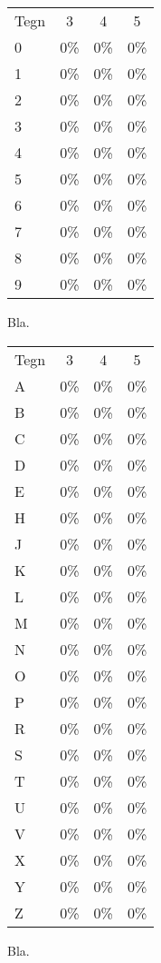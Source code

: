 \begin{figure}[htp]
\centering
\begin{tabular}{|l|c|c|c|}\hline
\rowcolor[gray]{0.9} \multicolumn{4}{|>{\columncolor[gray]{0.9}}c|}{\textbf{Sum-billeder}} \\ \hline
Tegn & 3 & 4 & 5\\\hline
0 & 0\% & 0\% & 0\%\\\hline
1 & 0\%  & 0\% & 0\%\\\hline
2 & 0\% & 0\% & 0\%\\\hline
3 & 0\% & 0\% & 0\%\\\hline
4 & 0\% & 0\% & 0\%\\\hline
5 & 0\% & 0\% & 0\%\\\hline
6 & 0\% & 0\% & 0\%\\\hline
7 & 0\% & 0\% & 0\%\\\hline
8 & 0\% & 0\% & 0\%\\\hline
9 & 0\% & 0\% & 0\%\\\hline
\end{tabular}
\caption{Bla.}
\label{fig:test:sum_tal}
\end{figure}

\begin{figure}[htp]
\centering
\begin{tabular}{|l|c|c|c|}\hline
\rowcolor[gray]{0.9} \multicolumn{4}{|>{\columncolor[gray]{0.9}}c|}{\textbf{Sum-billeder}} \\ \hline
Tegn & 3 & 4 & 5\\\hline
A & 0\% & 0\% & 0\%\\\hline
B & 0\% & 0\% & 0\%\\\hline
C & 0\% & 0\% & 0\%\\\hline
D & 0\% & 0\% & 0\%\\\hline
E & 0\% & 0\% & 0\%\\\hline
H & 0\% & 0\% & 0\%\\\hline
J & 0\% & 0\% & 0\%\\\hline
K & 0\% & 0\% & 0\%\\\hline 
L & 0\% & 0\% & 0\%\\\hline
M & 0\% & 0\% & 0\%\\\hline
N & 0\% & 0\% & 0\%\\\hline
O & 0\% & 0\% & 0\%\\\hline
P & 0\% & 0\% & 0\%\\\hline
R & 0\% & 0\% & 0\%\\\hline
S & 0\% & 0\% & 0\%\\\hline
T & 0\% & 0\% & 0\%\\\hline
U & 0\% & 0\% & 0\%\\\hline
V & 0\% & 0\% & 0\%\\\hline
X & 0\% & 0\% & 0\%\\\hline
Y & 0\% & 0\% & 0\%\\\hline
Z & 0\% & 0\% & 0\%\\\hline
\end{tabular}
\caption{Bla.}
\label{fig:test:sum_bogstav}
\end{figure}

